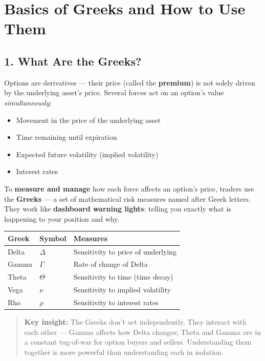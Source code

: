 \documentclass[12pt,openany]{book}
\begin{document}
\section{Basics of Greeks and How to Use Them}

\subsection{1. What Are the Greeks?}

Options are derivatives — their price (called the \textbf{premium}) is not solely driven by the underlying asset's price.
Several forces act on an option's value \emph{simultaneously}:

\begin{itemize}[leftmargin=*]
    \item Movement in the price of the underlying asset
    \item Time remaining until expiration
    \item Expected future volatility (implied volatility)
    \item Interest rates
\end{itemize}

To \textbf{measure and manage} how each force affects an option's price, traders use the \textbf{Greeks} — a set of mathematical risk measures named after Greek letters.
They work like \textbf{dashboard warning lights}: telling you exactly what is happening to your position and why.

\begin{center}
\scriptsize
\setlength{\tabcolsep}{3pt}
\begin{tabular}{|L{4.1cm}|L{4.1cm}|L{4.1cm}|}
\hline
\textbf{Greek} & \textbf{Symbol} & \textbf{Measures} \\
\hline
Delta & \(\Delta\) & Sensitivity to price of underlying \\
\hline
Gamma & \(\Gamma\) & Rate of change of Delta \\
\hline
Theta & \(\Theta\) & Sensitivity to time (time decay) \\
\hline
Vega & \(\nu\) & Sensitivity to implied volatility \\
\hline
Rho & \(\rho\) & Sensitivity to interest rates \\
\hline
\end{tabular}
\end{center}

\begin{quote}
\textbf{Key insight:} The Greeks don't act independently. They interact with each other — Gamma affects how Delta changes; Theta and Gamma are in a constant tug-of-war for option buyers and sellers. Understanding them together is more powerful than understanding each in isolation.
\end{quote}
\end{document}
